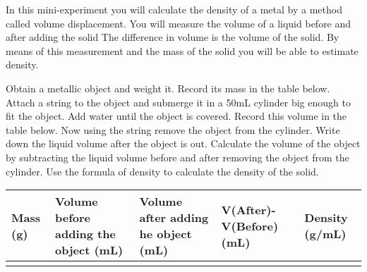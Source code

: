 \documentclass[main.tex]{subfiles}
\begin{document}
\newpage
\begin{fullwidth}
\vspace{0.2cm}{\large \bfseries 3. Density of a solid}
In this mini-experiment you will calculate the density of a metal by a method called volume displacement. You will measure the volume of a liquid before and after adding the solid The difference in volume is the volume of the solid. By means of this measurement and the mass of the solid you will be able to estimate density. 
\begin{steps}
    \newstep[] Obtain a metallic object and weight it. Record its mass in the table below.
        \newstep[]  Attach a string to the object and submerge it in a 50mL cylinder big enough to fit the object. 
        \newstep[]  Add water until the object is covered. Record this volume in the table below.   
         \newstep[] Now using the string remove the object from the cylinder. Write down the liquid volume after the object is out.
      \newstep[] Calculate the volume of the object by subtracting the liquid volume before and after removing the object from the cylinder.
       \newstep[] Use the formula of density to calculate the density of the solid.     
\end{steps}

\begin{center}\begin{tabular}{ |p{2cm}|p{3.5cm}|p{5.5cm}|p{3.5cm}|p{2.5cm}|  }
\hline
    Mass (g) &  Volume before adding the object (mL) & Volume after adding he object (mL)& V(After)-V(Before) (mL)& Density (g/mL)         \\
\hline
   \vspace{0cm}\vspace{.5cm} &     &   &&         \\
\hline
\end{tabular}\end{center}



\end{fullwidth}
\end{document}
